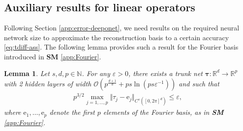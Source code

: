 \documentclass{article}
\numberwithin{equation}{section}
\newcommand{\fb}{\bm{\mathrm{e}}}
\newcommand{\R}{\mathbb{R}}
\newcommand{\N}{\mathbb{N}}
\renewcommand{\tr}{{{\tau}}}
\newcommand{\trunk}{{\bm{\tau}}}
\renewcommand{\epsilon}{\varepsilon}
\newcommand{\1}{\mathbbm{1}}
\newcommand{\bigO}{\mathcal{O}}
\newtheorem{lemma}[theorem]{Lemma}
\begin{document}
\subsection{Auxiliary results for linear operators}

Following Section \ref{app:error-deeponet}, we need results on the required neural network size to approximate the reconstruction basis to a certain accuracy \eqref{eq:tdiff-ass}. The following lemma provides such a result for the Fourier basis introduced in \textbf{SM} \ref{app:Fourier}. 

\begin{lemma}\label{lem:rec-fourier}
Let $s, d, p\in \N$. For any $\epsilon>0$, there exists a trunk net $\trunk: \R^d \to \R^p$ with 2 hidden layers of width $\bigO(p^{\frac{d+1}{d}}+ps\ln(ps\epsilon^{-1}))$ and such that 
\begin{align} \label{eq:Fourier-NN}
p^{3/2} \max_{j=1,\dots, p} \Vert \tr_j - \fb_j \Vert_{C^s([0,2\pi]^d)}
\le \epsilon,
\end{align}
where $\fb_1,\dots, \fb_p$ denote the first $p$ elements of the Fourier basis, as in \textbf{SM} \ref{app:Fourier}.

\end{lemma}
\end{document}
